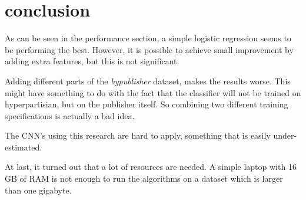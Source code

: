 \section{conclusion}

As can be seen in the performance section, a simple logistic regression seems to be performing the best. However, it is possible to achieve small improvement by adding extra features, but this is not significant. 

Adding different parts of the \textit{bypublisher} dataset, makes the results worse. This might have something to do with the fact that the classifier will not be trained on hyperpartisian, but on the publisher itself. So combining two different training specifications is actually a bad idea. 

The CNN's using this research are hard to apply, something that is easily under-estimated. 

At last, it turned out that a lot of resources are needed. A simple laptop with 16 GB of RAM is not enough to run the algorithms on a dataset which is larger than one gigabyte.